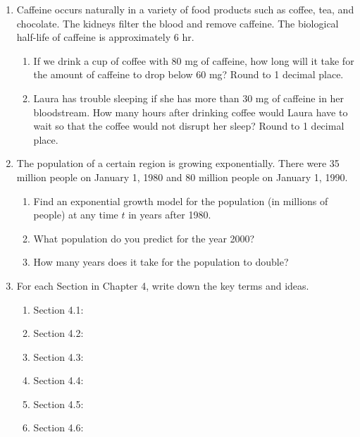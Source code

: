 \documentclass[12pt]{article}
\begin{document}
\begin{enumerate}
	\item Caffeine occurs naturally in a variety of food products such as coffee, tea, and chocolate. The kidneys filter the blood and remove caffeine.  The biological half-life of caffeine is approximately 6 hr. 
		\begin{enumerate}
			\item If we drink a cup of coffee with 80 mg of caffeine, how long will it take for the amount of caffeine to drop below 60 mg? Round to 1 decimal place.\vfill
			\item Laura has trouble sleeping if she has more than 30 mg of caffeine in her bloodstream. How many hours after drinking coffee would Laura have to wait so that the coffee would not disrupt her sleep? Round to 1 decimal place.\vfill
		\end{enumerate}
	
	
	
	\newpage
	\item The population of a certain region is growing exponentially. There were 35 million people on January 1, 1980 and 80 million people on January 1, 1990.
	
		\begin{enumerate}
			\item Find an exponential growth model for the population (in millions of people) at any time $t$ in years after 1980.
			\vfill
			\item What population do you predict for the year 2000?
			\vfill
			\item How many years does it take for the population to double?
			\vfill
		\end{enumerate}
	
	
	
	\newpage
	\item For each Section in Chapter 4, write down the key terms and ideas.
	\begin{enumerate}
		\item Section 4.1: \vfill
		\item Section 4.2: \vfill
		\item Section 4.3: \vfill
		\newpage
		\item Section 4.4: \vfill
		\item Section 4.5: \vfill 
		\item Section 4.6: \vfill 
	\end{enumerate}
\end{enumerate}
\end{document}
